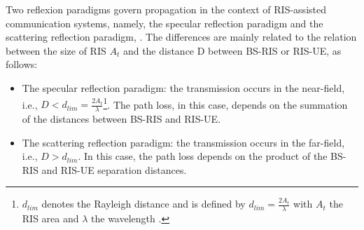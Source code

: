 \documentclass[conference]{IEEEtran}
\begin{document}
Two reflexion paradigms govern propagation in the context of RIS-assisted communication systems, namely, the specular reflection paradigm and the scattering reflection paradigm,  \cite{alfattani2021link}. The differences are mainly related to the relation between the size of RIS $A_t$ and the distance D between BS-RIS or RIS-UE, as follows:
\begin{itemize}
    \item The specular reflection paradigm: the transmission occurs in the near-field, i.e., $D<d_{lim} = \frac{2A_{t}}{\lambda}$\footnote{$d_{lim}$ denotes the Rayleigh distance and is defined by $d_{lim}=\frac{2A_{t}}{\lambda}  
    $ with $A_{t}$ the RIS area and $\lambda$ the wavelength \cite{alfattani2021link}.}. The path loss, in this case, depends on the summation of the distances between BS-RIS and RIS-UE. 
    \item The scattering reflection paradigm: the transmission occurs in the far-field, i.e., $D>d_{lim}$. In this case, the path loss depends on the product of the BS-RIS and RIS-UE separation distances.
\end{itemize}
\end{document}

